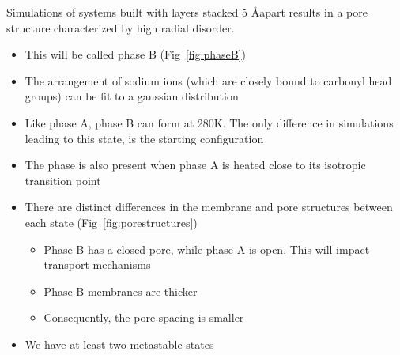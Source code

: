 \documentclass{article}
\newcommand{\angstrom}{\textup{\AA}}
\begin{document}
	Simulations of systems built with layers stacked 5 \angstrom apart results in a pore structure characterized by high radial disorder.
	\begin{itemize}
		\item This will be called phase B (Fig~\ref{fig:phaseB})
		\item The arrangement of sodium ions (which are closely bound to carbonyl head groups) can be fit to a gaussian distribution %
		\item Like phase A, phase B can form at 280K. The only difference in simulations leading to this state, is the starting configuration
		\item The phase is also present when phase A is heated close to its isotropic transition point
		\item There are distinct differences in the membrane and pore structures between each state (Fig~\ref{fig:porestructures})
		\begin{itemize}
			\item Phase B has a closed pore, while phase A is open. This will impact transport mechanisms
			\item Phase B membranes are thicker
			\item Consequently, the pore spacing is smaller
		\end{itemize}
		\item We have at least two metastable states
	\end{itemize}
\end{document}
